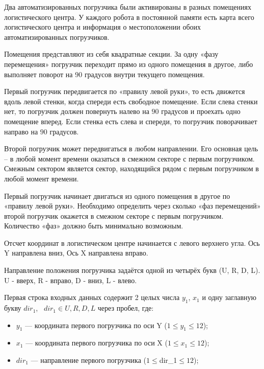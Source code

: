 
Два автоматизированных погрузчика были активированы в разных помещениях логистического центра. 
У каждого робота в постоянной памяти есть карта всего логистического 
центра и информация о местоположении обоих автоматизированных погрузчиков. 

Помещения представляют из себя квадратные секции. 
За одну «фазу перемещения» погрузчик переходит прямо из одного помещения в другое, 
либо выполняет поворот на $90$ градусов внутри текущего помещения.

Первый погрузчик передвигается по «правилу левой руки», то есть движется вдоль левой стенки, 
когда спереди есть свободное помещение. Если слева стенки нет, то погрузчик должен повернуть 
налево на $90$ градусов и проехать одно помещение вперед. Если стенка есть слева и спереди, то погрузчик 
поворачивает направо на $90$ градусов.

Второй погрузчик может передвигаться в любом направлении. 
Его основная цель – в любой момент времени оказаться в смежном секторе с первым погрузчиком. 
Смежным сектором является сектор, находящийся рядом с первым погрузчиком в любой момент времени.

Первый погрузчик начинает двигаться из одного помещения в другое по «правилу левой руки». 
Необходимо определить через сколько «фаз перемещений» второй погрузчик окажется в смежном секторе с первым погрузчиком. 
Количество «фаз» должно быть минимально возможным.

Отсчет координат в логистическом центре начинается с левого верхнего угла. Ось Y направлена вниз, Ось X направлена вправо.

Направление положения погрузчика задаётся одной из четырёх букв (U, R, D, L). U - вверх, R - вправо, D - вниз, L - влево.


Первая строка входных данных содержит 2 целых числа $y_{1}$, $x_{1}$ и одну заглавную букву $dir_{1}$,~ $dir_{1} \in {U,R,D,L}$ через пробел, где:
\begin{itemize}
    \item $y_{1}$ --- координата первого погрузчика по оси Y ($1 \leq y_{1} \leq 12$);
    \item $x_{1}$ --- координата первого погрузчика по оси X ($1 \leq x_{1} \leq 12$);
	\item $dir_{1}$ --- направление первого погрузчика ($1 \leq $dir_{1}$ \leq 12$);
\end{itemize}

